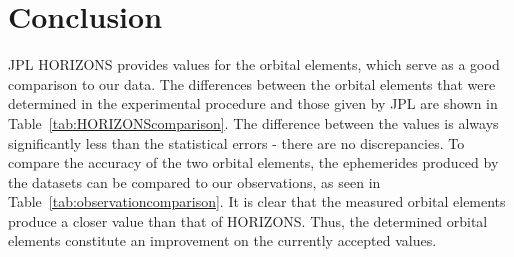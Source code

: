 \documentclass[12pt,journal,compsoc]{IEEEtran}
\begin{document}
\section{Conclusion}
JPL HORIZONS provides values for the orbital elements, which serve as a good comparison to our data.
The differences between the orbital elements that were determined in the experimental procedure and those given by JPL are shown in Table~\ref{tab:HORIZONScomparison}.
The difference between the values is always significantly less than the statistical errors - there are no discrepancies.
To compare the accuracy of the two orbital elements, the ephemerides produced by the datasets can be compared to our observations, as seen in Table~\ref{tab:observationcomparison}.
It is clear that the measured orbital elements produce a closer value than that of HORIZONS.
Thus, the determined orbital elements constitute an improvement on the currently accepted values.

\begin{table}[!t]
\centering
{}
\caption{Measured orbital elements in comparison with JPL HORIZONS orbital elements \label{tab:HORIZONScomparison}}
\end{table}

\begin{table}[!t]
\centering
{}
\caption{Comparison of JPL HORIZONS ephemeredes and ephemeredes from determined orbital elements with observation data\label{tab:observationcomparison}}
\end{table}
\end{document}
